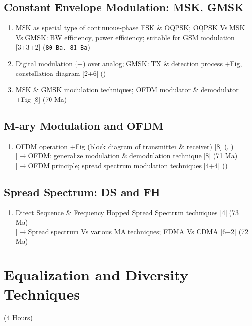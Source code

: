 \documentclass[12pt]{article}
\newcommand{\lb}{\\$\left|\rightarrow\right.$}
\begin{document}
  \subsection{Constant Envelope Modulation: MSK, GMSK}
    \begin{enumerate}[topsep=0pt, noitemsep]
      \item MSK as special type of continuous-phase FSK \& OQPSK;
        OQPSK Vs MSK Vs GMSK: BW efficiency, power efficiency;
        suitable for GSM modulation \hfill [3+3+2] (\texttt{80 Ba, 81 Ba})
      \item Digital modulation (+) over analog; GMSK: TX \& detection
        process +Fig, constellation diagram \hfill [2+6] ()
      \item MSK \& GMSK modulation techniques; OFDM modulator \& demodulator +Fig \hfill [8] (70 Ma)
    \end{enumerate}

  \subsection{M-ary Modulation and OFDM}
    \begin{enumerate}[topsep=0pt, noitemsep]
      \item OFDM operation +Fig (block diagram of transmitter \& receiver) \hfill [8] (, )
        \lb OFDM: generalize modulation \& demodulation technique \hfill [8] (71 Ma)
        \lb OFDM principle; spread spectrum modulation techniques \hfill [4+4] ()
    \end{enumerate}

  \subsection{Spread Spectrum: DS and FH}
    \begin{enumerate}[topsep=0pt, noitemsep]
      \item Direct Sequence \& Frequency Hopped Spread Spectrum techniques \hfill [4] (73 Ma)
        \lb Spread spectrum Vs various MA techniques; FDMA Vs CDMA \hfill [6+2] (72 Ma)
    \end{enumerate}

\pagebreak
\section{Equalization and Diversity Techniques}
\begin{center}(4 Hours)\end{center}
\end{document}
